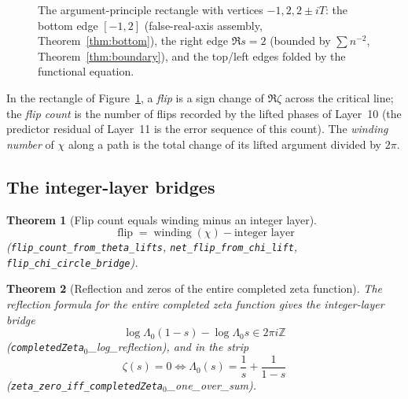 \documentclass{article}
\newtheorem{theorem}{Theorem}[section]
\newcommand{\Z}{\mathbb{Z}}
\newcommand{\GG}{\Gamma}
\newcommand{\zt}{\zeta}
\newcommand{\Lam}{\Lambda}
\newcommand{\Xchi}{\chi}
\begin{document}
\begin{figure}[h]
\centering
{}
\caption{The argument-principle rectangle with vertices $-1,2,2\pm iT$:
the bottom edge $[-1,2]$ (false-real-axis assembly, Theorem~\ref{thm:bottom}),
the right edge $\Re s=2$ (bounded by $\sum n^{-2}$,
Theorem~\ref{thm:boundary}), and the top/left edges folded by the
functional equation.}
\label{fig:rect}
\end{figure}

In the rectangle of Figure~\ref{fig:rect}, a \emph{flip} is a sign
change of $\Re\zt$ across the critical line; the
\emph{flip count} is the number of flips recorded by the lifted phases of
Layer~10 (the predictor residual of Layer~11 is the error sequence of this
count). The \emph{winding number} of $\Xchi$ along a path is the total
change of its lifted argument divided by $2\pi$.

\subsection{The integer-layer bridges}
\label{sec:bridge}

\begin{theorem}[Flip count equals winding minus an integer layer]
\label{thm:flipcount}
\[
\operatorname{flip}=\operatorname{winding}(\Xchi)-\text{integer layer}
\]
(\texttt{flip\_count\_from\_theta\_lifts},
\texttt{net\_flip\_from\_chi\_lift}, \texttt{flip\_chi\_circle\_bridge}).
\end{theorem}

\begin{theorem}[Reflection and zeros of the entire completed zeta function]
\label{thm:reflection}
The reflection formula for the entire completed zeta function gives the
integer-layer bridge
\[
\log\Lam_0(1-s)-\log\Lam_0 s\in 2\pi i\Z
\]
(\texttt{completedZeta}\(_0\)\_log\_reflection), and in the strip
\[
\zt(s)=0\iff\Lam_0(s)=\frac{1}{s}+\frac{1}{1-s}
\]
(\texttt{zeta\_zero\_iff\_completedZeta}\(_0\)\_one\_over\_sum).
\end{theorem}
\end{document}
